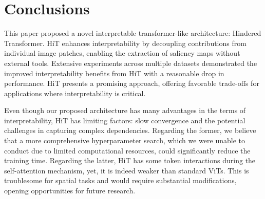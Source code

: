 \section{Conclusions}



This paper proposed a novel interpretable transformer-like architecture: Hindered Transformer. HiT enhances interpretability by decoupling contributions from individual image patches, enabling the extraction of saliency maps without external tools. 
Extensive experiments across multiple datasets demonstrated the improved interpretability benefits from HiT with a reasonable drop in performance. HiT presents a promising approach, offering favorable trade-offs for applications where interpretability is critical. 

Even though our proposed architecture has many advantages in the terms of interpretability, HiT has limiting factors: slow convergence and the potential challenges in capturing complex dependencies. Regarding the former, we believe that a more comprehensive hyperparameter search, which we were unable to conduct due to limited computational resources, could significantly reduce the training time. Regarding the latter, HiT has some token interactions during the self-attention mechanism, yet, it is indeed weaker than standard ViTs. This is troublesome for spatial tasks and would require substantial modifications, opening opportunities for future research.

